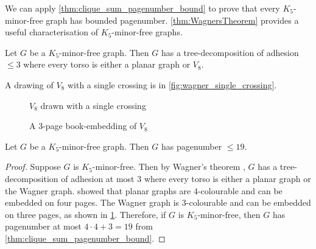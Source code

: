We can apply \cref{thm:clique_sum_pagenumber_bound} to prove that every $K_5$-minor-free graph has bounded pagenumber. \cref{thm:WagnersTheorem} provides a useful characterisation of $K_5$-minor-free graphs. 
\begin{theorem}\label{thm:WagnersTheorem}
	Let \(G\) be a \(K_5\)-minor-free graph. Then \(G\) has a tree-decomposition of adhesion $\leq 3$ where every torso is either a planar graph or \(V_8\).
\end{theorem}

A drawing of $V_8$ with a single crossing is in \cref{fig:wagner_single_crossing}. 

\begin{figure}[h!]
	\centering
	\begin{minipage}{0.5\textwidth}
		\centering
		
		\caption{$V_8$ drawn with a single crossing}\label{fig:wagner_single_crossing}
	\end{minipage}%
	\begin{minipage}{0.5\textwidth}
		\centering
		
		\caption[V8 book embedding]{A 3-page book-embedding of $V_8$}\label{fig:wagner_bookembedding}
	\end{minipage}
\end{figure}

\begin{theorem}
	Let \(G\) be a \(K_5\)-minor-free graph. Then \(G\) has pagenumber \(\leq 19\).
\end{theorem}

\begin{proof}
	Suppose \(G\) is \(K_5\)-minor-free. Then by Wagner's theorem \cite{wagnerUeberEigenschaftEbenen1937}, \(G\) has a tree-decomposition of adhesion at most 3 where every torso is either a planar graph or the Wagner graph.
	\textcite{yannakakisEmbeddingPlanarGraphs1989} showed that planar graphs are \(4\)-colourable and can be embedded on four pages. The Wagner graph is \(3\)-colourable and can be embedded on three pages, as shown in \cref{fig:wagner_bookembedding}. Therefore, if \(G\) is \(K_5\)-minor-free, then \(G\) has pagenumber at most \(4 \cdot 4 + 3 = 19\) from \cref{thm:clique_sum_pagenumber_bound}.
\end{proof}
